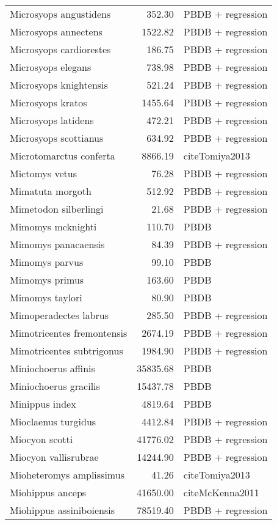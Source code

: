 \begin{table}[ht]
\begin{tabular}{lrl}
  Microsyops angustidens & 352.30 & PBDB + regression \\ 
  Microsyops annectens & 1522.82 & PBDB + regression \\ 
  Microsyops cardiorestes & 186.75 & PBDB + regression \\ 
  Microsyops elegans & 738.98 & PBDB + regression \\ 
  Microsyops knightensis & 521.24 & PBDB + regression \\ 
  Microsyops kratos & 1455.64 & PBDB + regression \\ 
  Microsyops latidens & 472.21 & PBDB + regression \\ 
  Microsyops scottianus & 634.92 & PBDB + regression \\ 
  Microtomarctus conferta & 8866.19 & cite{Tomiya2013} \\ 
  Mictomys vetus & 76.28 & PBDB + regression \\ 
  Mimatuta morgoth & 512.92 & PBDB + regression \\ 
  Mimetodon silberlingi & 21.68 & PBDB + regression \\ 
  Mimomys mcknighti & 110.70 & PBDB \\ 
  Mimomys panacaensis & 84.39 & PBDB + regression \\ 
  Mimomys parvus & 99.10 & PBDB \\ 
  Mimomys primus & 163.60 & PBDB \\ 
  Mimomys taylori & 80.90 & PBDB \\ 
  Mimoperadectes labrus & 285.50 & PBDB + regression \\ 
  Mimotricentes fremontensis & 2674.19 & PBDB + regression \\ 
  Mimotricentes subtrigonus & 1984.90 & PBDB + regression \\ 
  Miniochoerus affinis & 35835.68 & PBDB \\ 
  Miniochoerus gracilis & 15437.78 & PBDB \\ 
  Minippus index & 4819.64 & PBDB \\ 
  Mioclaenus turgidus & 4412.84 & PBDB + regression \\ 
  Miocyon scotti & 41776.02 & PBDB + regression \\ 
  Miocyon vallisrubrae & 14244.90 & PBDB + regression \\ 
  Mioheteromys amplissimus & 41.26 & cite{Tomiya2013} \\ 
  Miohippus anceps & 41650.00 & cite{McKenna2011} \\ 
  Miohippus assiniboiensis & 78519.40 & PBDB + regression \\ 

\end{tabular}
\end{table}
